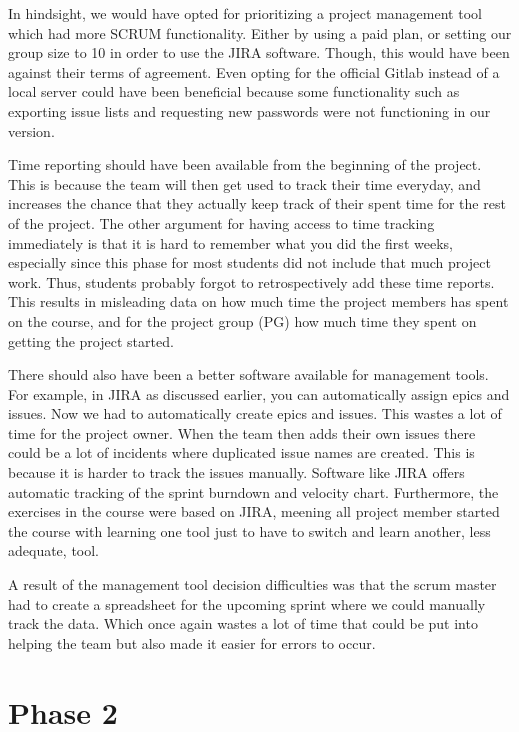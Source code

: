 \documentclass{article}
\begin{document}
In hindsight, we would have opted for prioritizing a project management tool which had more SCRUM functionality. Either by using a paid plan, or setting our group size to 10 in order to use the JIRA software. Though, this would have been against their terms of agreement. Even opting for the official Gitlab instead of a local server could have been beneficial because some functionality such as exporting issue lists and requesting new passwords were not functioning in our version.

Time reporting should have been available from the beginning of the project. This is because the team will then get used to track their time everyday, and increases the chance that they actually keep track of their spent time for the rest of the project. The other argument for having access to time tracking immediately is that it is hard to remember what you did the first weeks, especially since this phase for most students did not include that much project work. Thus, students probably forgot to retrospectively add these time reports. This results in misleading data on how much time the project members has spent on the course, and for the project group (PG) how much time they spent on getting the project started. 

There should also have been a better software available for management tools. For example, in JIRA as discussed earlier, you can automatically assign epics and issues. Now we had to automatically create epics and issues. This wastes a lot of time for the project owner. When the team then adds their own issues there could be a lot of incidents where duplicated issue names are created. This is because it is harder to track the issues manually. Software like JIRA offers automatic tracking of the sprint burndown and velocity chart. Furthermore, the exercises in the course were based on JIRA, meening all project member started the course with learning one tool just to have to switch and learn another, less adequate, tool.

A result of the management tool decision difficulties was that the scrum master had to create a spreadsheet for the upcoming sprint where we could manually track the data. Which once again wastes a lot of time that could be put into helping the team but also made it easier for errors to occur.


\section{Phase 2} %
\end{document}
